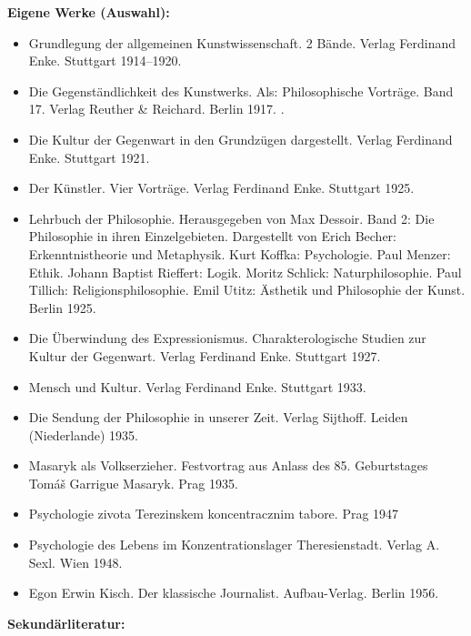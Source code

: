 \documentclass[a4paper]{article}
\begin{document}
\bigskip

\textbf{Eigene Werke (Auswahl):}

\begin{itemize}
\item Grundlegung der allgemeinen Kunstwissenschaft. 2 Bände. Verlag Ferdinand Enke. Stuttgart 1914–1920.  
\item Die Gegenständlichkeit des Kunstwerks. Als: Philosophische Vorträge. Band 17. Verlag Reuther \& Reichard. Berlin
1917. .  
\item Die Kultur der Gegenwart in den Grundzügen dargestellt. Verlag Ferdinand Enke. Stuttgart 1921.  
\item Der Künstler. Vier Vorträge. Verlag Ferdinand Enke. Stuttgart 1925.  
\item Lehrbuch der Philosophie. Herausgegeben von Max Dessoir. Band 2: Die Philosophie in ihren Einzelgebieten.
Dargestellt von Erich Becher: Erkenntnistheorie und Metaphysik. Kurt Koffka: Psychologie. Paul Menzer: Ethik. Johann
Baptist Rieffert: Logik. Moritz Schlick: Naturphilosophie. Paul Tillich: Religionsphilosophie. Emil Utitz: Ästhetik und
Philosophie der Kunst. Berlin 1925.  
\item Die Überwindung des Expressionismus. Charakterologische Studien zur Kultur der Gegenwart. Verlag Ferdinand Enke.
Stuttgart 1927.  
\item Mensch und Kultur. Verlag Ferdinand Enke. Stuttgart 1933.  
\item Die Sendung der Philosophie in unserer Zeit. Verlag Sijthoff. Leiden (Niederlande) 1935.  
\item Masaryk als Volkserzieher. Festvortrag aus Anlass des 85. Geburtstages Tomáš Garrigue Masaryk. Prag 1935.  
\item Psychologie zivota Terezinskem koncentracznim tabore. Prag 1947  
\item Psychologie des Lebens im Konzentrationslager Theresienstadt. Verlag A. Sexl. Wien 1948.  
\item Egon Erwin Kisch. Der klassische Journalist. Aufbau-Verlag. Berlin 1956.  
\end{itemize}

\bigskip

\textbf{Sekundärliteratur:}
\end{document}

